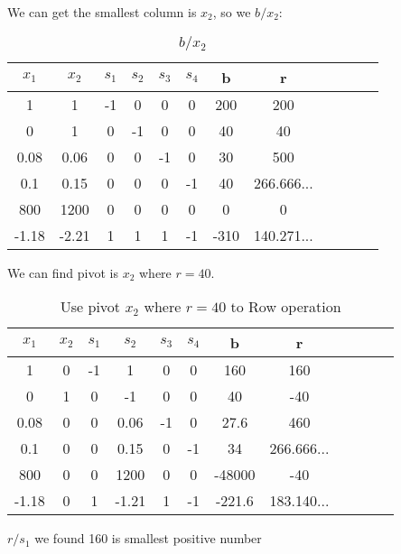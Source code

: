 \documentclass{article}
\begin{document}
  We can get the smallest column is $x_2$, so we $b/x_2$:
  \begin{table}[H]
  \centering
  \caption{$b/x_2$}
  \begin{tabular}{|c|c|c|c|c|c|c|c|c|c|c|c|}
  \hline
  $x_1$ & $x_2$ & $s_1$  & $s_2$ & $s_3$ & $s_4$ & b & r  \\ \hline
  1    & 1    & -1       & 0    & 0    & 0    & 200  & 200\\ \hline
  0    & 1    & 0        & -1   & 0    & 0    & 40   & \cellcolor{yellow}40\\ \hline
  0.08 & 0.06 & 0        & 0    & -1   & 0    & 30   & 500\\ \hline
  0.1  & 0.15 & 0        & 0    & 0    & -1   & 40   & 266.666...\\ \hline
  800  & 1200 & 0        & 0    & 0    & 0    & 0    & 0\\ \hline
  -1.18 & -2.21  & 1     & 1    & 1    & -1   & -310 & 140.271...   \\ \hline
  \end{tabular}
  \end{table}

  We can find pivot is $x_2$ where $r=40$.

  \begin{table}[H]
  \centering
  \caption{Use pivot $x_2$ where $r=40$ to Row operation}
  \begin{tabular}{|c|c|c|c|c|c|c|c|c|c|c|c|}
  \hline
  $x_1$ & $x_2$ & $s_1$  & $s_2$ & $s_3$ & $s_4$ & b & r  \\ \hline
  1    & 0      & -1       & 1       & 0    & 0    & 160  & \cellcolor{yellow}160\\ \hline
  0    & 1      & 0        & -1      & 0    & 0    & 40   & -40\\ \hline
  0.08 & 0      & 0        & 0.06    & -1   & 0    & 27.6 & 460\\ \hline
  0.1  & 0      & 0        & 0.15    & 0    & -1   & 34   & 266.666...\\ \hline
  800  & 0      & 0        & 1200    & 0    & 0    & -48000 & -40\\ \hline
  -1.18 &0      & 1        & \cellcolor{green}-1.21   & 1    & -1   & -221.6 & 183.140...   \\ \hline
  \end{tabular}
  \end{table}

  $r/s_1$ we found 160 is smallest positive number
\end{document}
